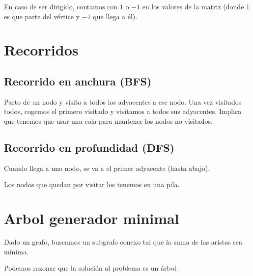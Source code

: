 En caso de ser dirigido, contamos con $1$ o $-1$ en los valores de la matriz (donde 1 es que parte del vértice y $-1$ que llega a él).

\section{Recorridos}
\subsection{Recorrido en anchura (BFS)}
Parto de un nodo y visito a todos los adyacentes a ese nodo. Una vez visitados todos, cogemos el primero visitado y visitamos a todos sus adyacentes.
Implica que tenemos que usar una cola para mantener los nodos no visitados.

\subsection{Recorrido en profundidad (DFS)}
Cuando llega a uno nodo, se va a el primer adyacente (hasta abajo).

Los nodos que quedan por visitar los tenemos en una pila.

\section{Arbol generador minimal}
Dado un grafo, buscamos un subgrafo conexo tal que la suma de las aristas sea mínima. 

Podemos razonar que la solución al problema es un árbol.

